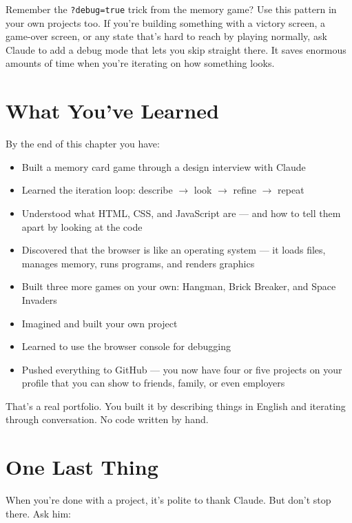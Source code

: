 \documentclass[11pt,a4paper]{article}
\begin{document}
Remember the \texttt{?debug=true} trick from the memory game? Use this pattern in your own projects too. If you're building something with a victory screen, a game-over screen, or any state that's hard to reach by playing normally, ask Claude to add a debug mode that lets you skip straight there. It saves enormous amounts of time when you're iterating on how something looks.

\section{What You've Learned}

By the end of this chapter you have:

\begin{itemize}[leftmargin=1.5em]
  \item Built a memory card game through a design interview with Claude
  \item Learned the iteration loop: describe \(\rightarrow\) look \(\rightarrow\) refine \(\rightarrow\) repeat
  \item Understood what HTML, CSS, and JavaScript are --- and how to tell them apart by looking at the code
  \item Discovered that the browser is like an operating system --- it loads files, manages memory, runs programs, and renders graphics
  \item Built three more games on your own: Hangman, Brick Breaker, and Space Invaders
  \item Imagined and built your own project
  \item Learned to use the browser console for debugging
  \item Pushed everything to GitHub --- you now have four or five projects on your profile that you can show to friends, family, or even employers
\end{itemize}

That's a real portfolio. You built it by describing things in English and iterating through conversation. No code written by hand.

\section{One Last Thing}

When you're done with a project, it's polite to thank Claude. But don't stop there. Ask him:
\end{document}
